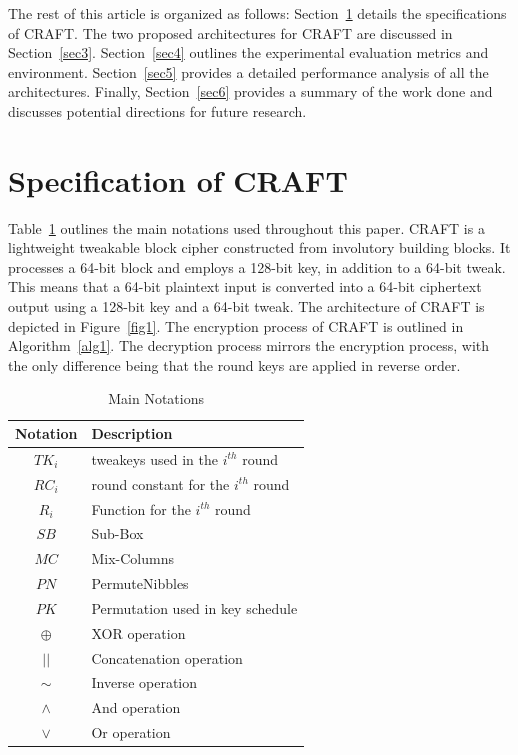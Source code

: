 \documentclass[final,5p,times,twocolumn]{elsarticle}
\begin{document}
The rest of this article is organized as follows: Section~\ref{sec2} details the specifications of CRAFT. The two proposed architectures for CRAFT are discussed in Section~\ref{sec3}. Section~\ref{sec4} outlines the experimental evaluation metrics and environment. Section~\ref{sec5} provides a detailed performance analysis of all the architectures. Finally, Section~\ref{sec6} provides a summary of the work done and discusses potential directions for future research.

\section{Specification of CRAFT}\label{sec2}

Table~\ref{tab1} outlines the main notations used throughout this paper.
CRAFT is a lightweight tweakable block cipher constructed from involutory building blocks.
It processes a 64-bit block and employs a 128-bit key, in addition to a 64-bit tweak.
This means that a 64-bit plaintext input is converted into a 64-bit ciphertext output using a 128-bit key and a 64-bit tweak.
The architecture of CRAFT is depicted in Figure~\ref{fig1}.
The encryption process of CRAFT is outlined in Algorithm~\ref{alg1}.
The decryption process mirrors the encryption process, with the only difference being that the round keys are applied in reverse order.


\begin{table}[h]
    \centering
    \caption{Main Notations}\label{tab1}%
    \begin{tabular}{|c|l|}
        \hline
        Notation & Description                           \\
        \hline
        $TK_i$   & tweakeys used in the $i^{th}$ round   \\
        $RC_i$   & round constant for the $i^{th}$ round \\
        $R_i$    & Function for the $i^{th}$ round       \\
        $SB$     & Sub-Box                                 \\
        $MC$     & Mix-Columns                           \\
        $PN$     & PermuteNibbles                        \\
        $PK$     & Permutation used in key schedule      \\
        $\oplus$ & XOR operation                         \\
        $||$     & Concatenation operation               \\
        $\sim$   & Inverse operation                     \\
        $\land$  & And operation                         \\
        $\lor$   & Or operation                          \\
        \hline
    \end{tabular}
\end{table}
\end{document}
